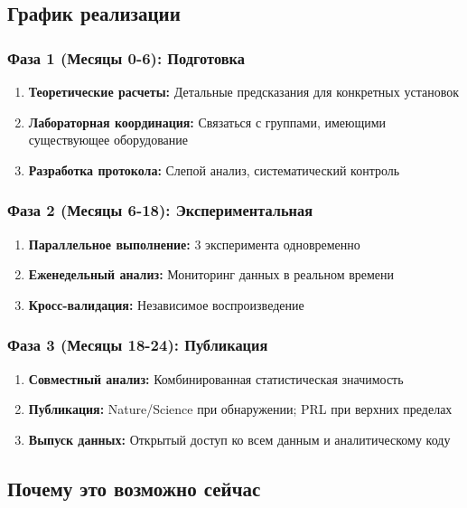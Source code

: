 \documentclass[11pt,a4paper]{article}
\begin{document}
	\subsection{График реализации}
	
	\subsubsection{Фаза 1 (Месяцы 0-6): Подготовка}
	
	\begin{enumerate}
		\item \textbf{Теоретические расчеты:} Детальные предсказания для конкретных установок
		\item \textbf{Лабораторная координация:} Связаться с группами, имеющими существующее оборудование
		\item \textbf{Разработка протокола:} Слепой анализ, систематический контроль
	\end{enumerate}
	
	\subsubsection{Фаза 2 (Месяцы 6-18): Экспериментальная}
	
	\begin{enumerate}
		\item \textbf{Параллельное выполнение:} 3 эксперимента одновременно
		\item \textbf{Еженедельный анализ:} Мониторинг данных в реальном времени
		\item \textbf{Кросс-валидация:} Независимое воспроизведение
	\end{enumerate}
	
	\subsubsection{Фаза 3 (Месяцы 18-24): Публикация}
	
	\begin{enumerate}
		\item \textbf{Совместный анализ:} Комбинированная статистическая значимость
		\item \textbf{Публикация:} Nature/Science при обнаружении; PRL при верхних пределах
		\item \textbf{Выпуск данных:} Открытый доступ ко всем данным и аналитическому коду
	\end{enumerate}
	
	\subsection{Почему это возможно сейчас}
	
\end{document}
